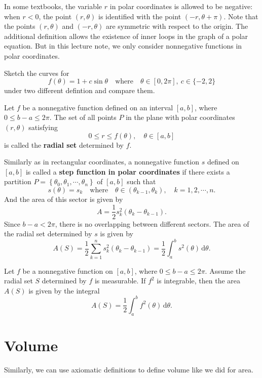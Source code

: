	\begin{remarkenv}
		In some textbooks, the variable $r$ in polar coordinates is allowed to be negative: when $r<0$, the point $(r,\theta)$ is identified with the point $(-r,\theta+\pi)$.  Note that the points $(r,\theta)$ and $(-r,\theta)$ are symmetric with respect to the origin. The additional definition allows the existence of inner loops in the graph of a polar equation. But in this lecture note, we only consider nonnegative functions in polar coordinates.
	\end{remarkenv}
	\begin{exampleenv}
		Sketch the curves for
		\[
		f(\theta)=1+c\sin\theta\quad \text{where}\quad\theta\in[0,2\pi],\ c\in\{-2,2\}
		\]
		under two different defintion and compare them.
	\end{exampleenv}
	\begin{definitionenv}
		Let $f$ be a nonnegative function defined on an interval $[a,b]$, where $0\le b-a\le 2\pi$. The set of all points $P$ in the plane with polar coordinates $(r,\theta)$ satisfying
		\[
		0\le r \le f(\theta),\quad \theta\in [a,b]
		\]
		is called the \textbf{radial set} determined by $f$.
	\end{definitionenv}
	\begin{definitionenv}
		Similarly as in rectangular coordinates, a nonnegative function $s$ defined on $[a,b]$ is called a \textbf{step function in polar coordinates} if there exists a partition $P=\left\{\theta_0,\theta_1,\cdots,\theta_n\right\}$ of $[a,b]$ such that
		\[
		s(\theta)=s_k\quad\text{where}\quad \theta \in (\theta_{k-1},\theta_k),\quad k=1,2,\cdots,n.
		\]
		And the area of this sector is given by
		\[
		A=\frac12 s_k^2(\theta_k-\theta_{k-1}).
		\]
		Since $b-a<2\pi$, there is no overlapping between different sectors. The area of the radial set determined by $s$ is given by
		\[
		A(S)=\frac12 \sum_{k=1}^n s_k^2(\theta_k-\theta_{k-1})=\frac12 \int_a^b s^2(\theta)\,\mathrm{d}\theta.
		\]
	\end{definitionenv}
	\begin{theoremenv}
		Let $f$ be a nonnegative function on $[a,b]$, where $0\le b-a\le 2\pi$. Assume the radial set $S$ determined by $f$ is measurable. If $f^2$ is integrable, then the area $A(S)$ is given by the integral
		\[
		A(S)=\frac12 \int_a^b f^2(\theta)\,\mathrm{d}\theta.
		\]
	\end{theoremenv}

	\section{Volume}
	Similarly, we can use axiomatic definitions to define volume like we did for area.

